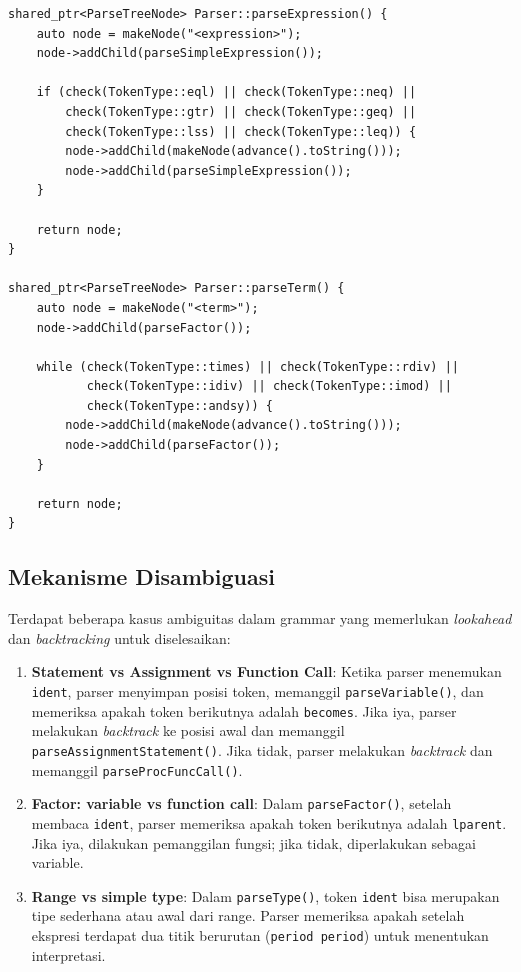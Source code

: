 ﻿\documentclass[12pt,a4paper]{article}
\begin{document}
\begin{lstlisting}[style=cpp, caption={Implementasi ekspresi dengan hierarki operator}]
shared_ptr<ParseTreeNode> Parser::parseExpression() {
    auto node = makeNode("<expression>");
    node->addChild(parseSimpleExpression());

    if (check(TokenType::eql) || check(TokenType::neq) ||
        check(TokenType::gtr) || check(TokenType::geq) ||
        check(TokenType::lss) || check(TokenType::leq)) {
        node->addChild(makeNode(advance().toString()));
        node->addChild(parseSimpleExpression());
    }

    return node;
}

shared_ptr<ParseTreeNode> Parser::parseTerm() {
    auto node = makeNode("<term>");
    node->addChild(parseFactor());

    while (check(TokenType::times) || check(TokenType::rdiv) ||
           check(TokenType::idiv) || check(TokenType::imod) ||
           check(TokenType::andsy)) {
        node->addChild(makeNode(advance().toString()));
        node->addChild(parseFactor());
    }

    return node;
}
\end{lstlisting}

\subsection{Mekanisme Disambiguasi}

Terdapat beberapa kasus ambiguitas dalam grammar yang memerlukan \textit{lookahead} dan \textit{backtracking} untuk diselesaikan:

\begin{enumerate}
    \item \textbf{Statement vs Assignment vs Function Call}: Ketika parser menemukan \texttt{ident}, parser menyimpan posisi token, memanggil \texttt{parseVariable()}, dan memeriksa apakah token berikutnya adalah \texttt{becomes}. Jika iya, parser melakukan \textit{backtrack} ke posisi awal dan memanggil \texttt{parseAssignmentStatement()}. Jika tidak, parser melakukan \textit{backtrack} dan memanggil \texttt{parseProcFuncCall()}.
    \item \textbf{Factor: variable vs function call}: Dalam \texttt{parseFactor()}, setelah membaca \texttt{ident}, parser memeriksa apakah token berikutnya adalah \texttt{lparent}. Jika iya, dilakukan pemanggilan fungsi; jika tidak, diperlakukan sebagai variable.
    \item \textbf{Range vs simple type}: Dalam \texttt{parseType()}, token \texttt{ident} bisa merupakan tipe sederhana atau awal dari range. Parser memeriksa apakah setelah ekspresi terdapat dua titik berurutan (\texttt{period period}) untuk menentukan interpretasi.
\end{enumerate}
\end{document}

